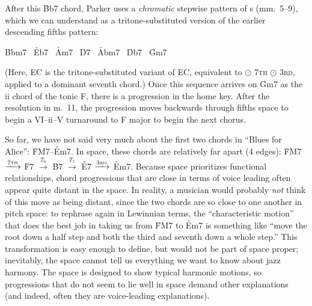 After this \h{Bb7} chord, Parker uses a \emph{chromatic} stepwise pattern of \tf{}s
(mm.~5--9), which we can understand as a tritone-substituted version of the
earlier descending fifths pattern:

\begin{center}
  \h{Bbm7} \TFarrow\ \h{Eb7} \ECTarrow\
  \h{Am7}  \TFarrow\ \h{D7}  \ECTarrow\
  \h{Abm7} \TFarrow\ \h{Db7} \ECTarrow\
  \h{Gm7}
\end{center}

\noindent (Here, EC is the tritone-substituted variant of EC,
equivalent to \tft $\odot$ \textsc{7th} $\odot$ \textsc{3rd}, applied to a
dominant seventh chord.) Once this sequence arrives on \h{Gm7} as the ii chord
of the tonic F, there is a \tfo progression in the home key. After the
resolution in m.~11, the progression moves backwards through fifths space to
begin a VI--ii--V turnaround to F major to begin the next chorus.\fn{tft-8}

So far, we have not said very much about the first two chords in ``Blues for
Alice'': \h{FM7}--\h{Em7}. In \tf space, these chords are relatively far
apart (4 edges): \h{FM7} $\xrightarrow{\text{\textsc{7th}}}$ \h{F7} $\xrightarrow{T_6}$
\h{B7} $\xrightarrow{T_5}$ \h{E7} $\xrightarrow{\text{\textsc{3rd}}}$ \h{Em7}.
Because \tf space prioritizes functional relationships, chord progressions
that are close in terms of voice leading often appear quite distant in the
space. In reality, a musician would probably \emph{not} think of this move as
being distant, since the two chords are so close to one another
in pitch space: to rephrase again in Lewinnian terms, the ``characteristic
motion'' that does the best job in taking us from \h{FM7} to \h{Em7} is
something like ``move the root down a half step and both the third and seventh
down a whole step.'' This transformation is easy enough to define, but would
not be part of \tf space proper; inevitably, the space cannot tell us
everything we want to know about jazz harmony. The space is designed to show
typical harmonic motions, so progressions that do not seem to lie well in \tf
space demand other explanations (and indeed, often they are voice-leading
explanations).





